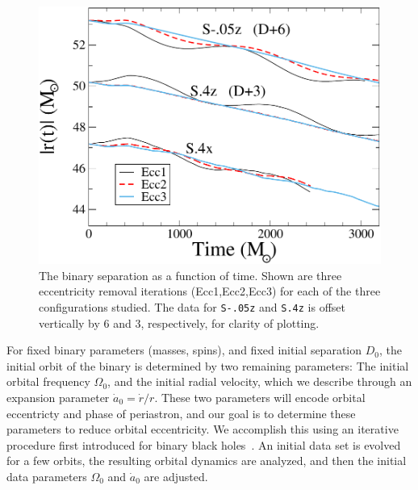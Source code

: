 {\begin{figure}
  \includegraphics[width=0.95\columnwidth]{chap2/DvT2}\caption[Binary separation as a function of time.]{
{\label{fig:DvT}}
The
    binary separation as a function of time.  Shown are three
    eccentricity removal iterations (Ecc1,Ecc2,Ecc3) for each of the
    three configurations studied.  The data for {\tt S-.05z} and {\tt S.4z} is
    offset vertically by 6 and 3, respectively, for clarity of
    plotting.}
\end{figure}


For fixed binary parameters (masses, spins), and fixed initial
separation $D_0$, the initial orbit of the binary is determined by two
remaining parameters: The initial orbital frequency $\Omega_0$, and
the initial radial velocity, which we describe through an expansion
parameter $\dot{a}_0 = \dot{r}/r$.  These two parameters will encode
orbital eccentricty and phase of periastron, and our goal is to
determine these parameters to reduce orbital eccentricity.  We
accomplish this using an iterative procedure first introduced
  for binary black holes~\cite{Boyle2007,Buonanno:2010yk}. An initial
data set is evolved for a few orbits, the resulting orbital dynamics
are analyzed, and then the initial data parameters $\Omega_0$ and
$\dot a_0$ are adjusted.


}

